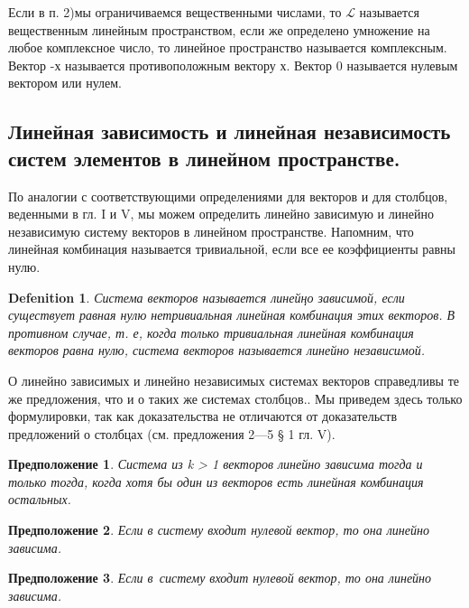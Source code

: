 \documentclass[11pt; a4paper]{report}
\theoremstyle{plain} %
\newtheorem{sug}{Предположение}[section]
\theoremstyle{defenition}
\newtheorem{glob_def}{Defenition}
\theoremstyle{remark}
\begin{document}
Если в п. 2)мы ограничиваемся вещественными чис­лами, то $\mathscr{L}$ называется вещественным линейным прост­ранством, если же определено умножение на любое комплексное число, то линейное пространство называется комплексным.
Вектор -х называется противоположным вектору х.
Вектор 0 называется нулевым вектором или нулем.

\subsection{\Large Линейная зависимость и линейная независимость систем элементов в линейном пространстве.}
По аналогии с соответствую­щими определениями для векторов и для столбцов, веденными в гл. I и V, мы можем определить линейно зависимую и линейно независимую систему векторов в линейном пространстве. Напомним, что линейная комбина­ция называется тривиальной, если все ее коэффициенты равны нулю.\\

\begin{glob_def}
Система векторов называется линейңо зависимой, если существует равная нулю нетривиальная линейная комбинация этих векторов. В против­ном случае, т. е, когда только тривиальная линейная ком­бинация векторов равна нулю,  система векторов назы­вается линейно независимой. \\
\end{glob_def}

О линейно зависимых и линейно независимых систе­мах векторов справедливы те же предложения, что и о таких же системах столбцов.. Мы приведем здесь только формулировки, так как доказательства не отличаются от доказательств предложений о столбцах (см. предложения 2—5 § 1 гл. V). \\
\begin{sug}\label{6.1}
Система из k > 1 векторов линейно зависима тогда и только тогда, когда хотя бы один из векторов есть линейная комбинация остальных.\\
\end{sug}

\begin{sug}\label{sug6.2}
Если в систему входит нулевой вектор, то она линейно зависима.\\
\end{sug}

\begin{sug}\label{sug6.3}
Если в~систему входит нулевой вектор, то она линейно зависима.\\
\end{sug}
\end{document}
